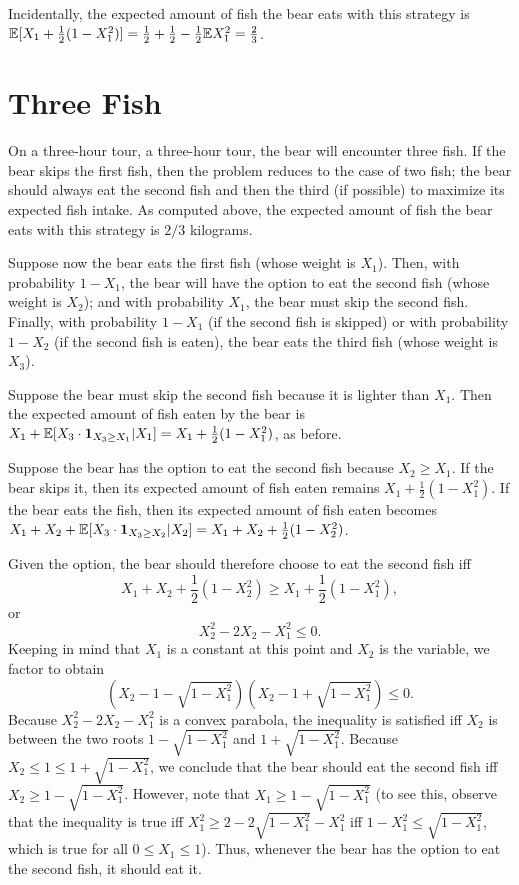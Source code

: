 Incidentally, the expected amount of fish the bear eats with this strategy is $\mathbb{E}[X_1 + \frac{1}{2}(1-X_1^2)] = \frac{1}{2} + \frac{1}{2} - \frac{1}{2}\mathbb{E}{X_1^2} = \frac{2}{3}$.

\section{Three Fish}

On a three-hour tour, a three-hour tour, the bear will encounter three fish. If the bear skips the first fish, then the problem reduces to the case of two fish; the bear should always eat the second fish and then the third (if possible) to maximize its expected fish intake. As computed above, the expected amount of fish the bear eats with this strategy is $2/3$ kilograms.

Suppose now the bear eats the first fish (whose weight is $X_1$). Then, with probability $1-X_1$, the bear will have the option to eat the second fish (whose weight is $X_2$); and with probability $X_1$, the bear must skip the second fish. Finally, with probability $1-X_1$ (if the second fish is skipped) or with probability $1-X_2$ (if the second fish is eaten), the bear eats the third fish (whose weight is $X_3$).

Suppose the bear must skip the second fish because it is lighter than $X_1$. Then the expected amount of fish eaten by the bear is $X_1 + \mathbb{E}[X_3 \cdot \mathbf{1}_{X_3 \geq X_1}|X_1] = X_1 + \frac{1}{2}(1-X_1^2)$, as before.

Suppose the bear has the option to eat the second fish because $X_2 \geq X_1$. If the bear skips it, then its expected amount of fish eaten remains $X_1 + \frac{1}{2}(1-X_1^2)$. If the bear eats the fish, then its expected amount of fish eaten becomes $X_1 + X_2 + \mathbb{E}[X_3 \cdot \mathbf{1}_{X_3 \geq X_2}|X_2] = X_1 + X_2 + \frac{1}{2}(1-X_2^2)$.

Given the option, the bear should therefore choose to eat the second fish iff
	\[ X_1 + X_2 + \frac{1}{2}(1-X_2^2) \geq X_1 + \frac{1}{2}(1-X_1^2), \]
or
	\[ X_2^2 - 2X_2 - X_1^2 \leq 0. \]
Keeping in mind that $X_1$ is a constant at this point and $X_2$ is the variable, we factor to obtain
	\[ \left(X_2 - 1 - \sqrt{1-X_1^2}\right) \left(X_2 - 1 + \sqrt{1-X_1^2}\right) \leq 0. \]
Because $X_2^2 - 2X_2 - X_1^2$ is a convex parabola, the inequality is satisfied iff $X_2$ is between the two roots $1 - \sqrt{1-X_1^2}$ and $1 + \sqrt{1-X_1^2}$. Because $X_2 \leq 1 \leq 1 + \sqrt{1-X_1^2}$, we conclude that the bear should eat the second fish iff $X_2 \geq 1 - \sqrt{1-X_1^2}$. However, note that $X_1 \geq 1 - \sqrt{1-X_1^2}$ (to see this, observe that the inequality is true iff $X_1^2 \geq 2 - 2\sqrt{1-X_1^2} - X_1^2$ iff $1 - X_1^2 \leq \sqrt{1-X_1^2}$, which is true for all $0 \leq X_1 \leq 1$). Thus, whenever the bear has the option to eat the second fish, it should eat it.

